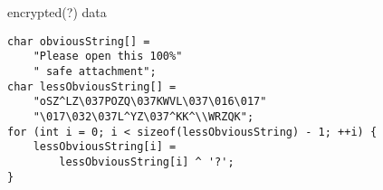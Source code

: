 \begin{frame}[fragile,label=encryptData]{encrypted(?) data}
\lstset{language=C,style=small}
\begin{lstlisting}
char obviousString[] =
    "Please open this 100%"
    " safe attachment";
char lessObviousString[] = 
    "oSZ^LZ\037POZQ\037KWVL\037\016\017"
    "\017\032\037L^YZ\037^KK^\\WRZQK";
for (int i = 0; i < sizeof(lessObviousString) - 1; ++i) {
    lessObviousString[i] =
        lessObviousString[i] ^ '?';
}
\end{lstlisting}
\end{frame}

